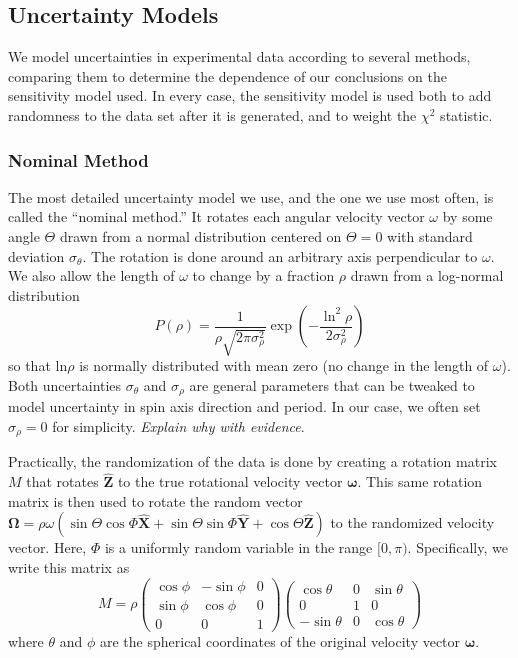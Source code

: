 \documentclass{aastex631}
\newcommand{\unit}[1]{\hat{\bm{#1}}}
\newcommand{\parens}[1]{\left( #1 \right)}
\newcommand{\jtd}[1]{{\color{red}\textit{#1}}}
\begin{document}
\subsection{Uncertainty Models}
\label{sec:uncertainty-models}
We model uncertainties in experimental data according to several methods, comparing them to determine the dependence of our conclusions on the sensitivity model used. In every case, the sensitivity model is used both to add randomness to the data set after it is generated, and to weight the $\chi^2$ statistic.

\subsubsection{Nominal Method}
The most detailed uncertainty model we use, and the one we use most often, is called the ``nominal method.'' It rotates each angular velocity vector $\omega$ by some angle $\Theta$ drawn from a normal distribution centered on $\Theta=0$ with standard deviation $\sigma_\theta$. The rotation is done around an arbitrary axis perpendicular to $\omega$. We also allow the length of $\omega$ to change by a fraction $\rho$ drawn from a log-normal distribution
\begin{equation}
  P(\rho) = \frac{1}{\rho\sqrt{2\pi \sigma_\rho^2}} \exp\parens{-\frac{\ln^2\rho}{2\sigma_\rho^2}}
\end{equation}
so that $\mathrm{ln} \rho$ is normally distributed with mean zero (no change in the length of $\omega$). Both uncertainties $\sigma_\theta$ and $\sigma_\rho$ are general parameters that can be tweaked to model uncertainty in spin axis direction and period. In our case, we often set $\sigma_\rho = 0$ for simplicity. \jtd{Explain why with evidence}.

Practically, the randomization of the data is done by creating a rotation matrix $M$ that rotates $\unit Z$ to the true rotational velocity vector $\bm \omega$. This same rotation matrix is then used to rotate the random vector $\bm \Omega = \rho \omega (\sin \Theta \cos\Phi \unit X + \sin \Theta \sin \Phi\unit Y + \cos \Theta\unit Z)$ to the randomized velocity vector. Here, $\Phi$ is a uniformly random variable in the range $[0, \pi)$. Specifically, we write this matrix as
\begin{equation}
M = \rho\parens{\begin{array}{ccc}
\cos \phi & -\sin \phi & 0\\
\sin \phi & \cos \phi & 0\\
0 & 0 & 1
\end{array}}
\parens{\begin{array}{ccc}
\cos \theta & 0 & \sin \theta \\
0 & 1 & 0\\
-\sin \theta & 0 & \cos \theta
\end{array}}
\label{eqn:rotate-uncertainty-matrix}
\end{equation}
where $\theta$ and $\phi$ are the spherical coordinates of the original velocity vector $\bm \omega.$
\end{document}
